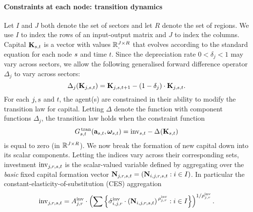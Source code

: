 \documentclass[12pt,a4paper,twoside, draft]{article}
\begin{document}
\paragraph{Constraints at each node: transition dynamics}
Let $I$ and $J$ both denote the set of sectors and let $R$ denote the set of
regions.
We use $I$ to index the rows of an input-output matrix and $J$ to index the
columns.
Capital $\mathbf{K}_{{s}, t}$ is a vector with values
$\nnreal ^ {J \times R}$ that evolves according to the standard equation for
each node ${s}$ and time $t$.
Since the depreciation rate $0 < \delta_{j} < 1$ may vary across sectors, we
allow the following generalised forward difference operator $\Delta_j$ to vary
across sectors:
\[
  \Delta_{j}(\mathbf{K}_{j, {s}, t})
    = \mathbf{K}_{j, {s}, t + 1} -
      (1 - \delta_j) \cdot \mathbf{K}_{j, {s}, t}. 
\]
For each $j, {s} $ and $t$, the agent(s) are constrained in their ability to
modify the transition law for capital.
Letting $\Delta$ denote the function with component functions
$\Delta_{j}$, the transition law holds when the constraint function
\begin{equation}\label{eq-kapital}
  G_{{s}, t}^{\,\textup{tran}}(
    \mathbf{a}_{{s}, t}, \boldsymbol{\omega}_{{s}, t}
  )
    = \textup{inv}_{{s}, t}
      - \Delta_{}(\mathbf{K}_{{s}, t})
\end{equation}
is equal to zero (in $\mathbb R^{J \times R}$).
We now break the formation of new capital down into its scalar components.
Letting the indices vary across their corresponding sets, investment
$\textup{inv}_{j, r, {s}, t}$ is the scalar-valued variable defined by
aggregating over the \emph{basic} fixed capital formation vector
$\mathbf{N}_{j, r, {s}, t} = (\mathbf{N}_{i,j, r, {s}, t}: i \in I)$.
In particular the constant-elasticity-of-substitution (CES) aggregation
\begin{equation}\label{eq-ces-inv}
  \textup{inv}_{j, r, \node, t} = A_{j, r}^{\textup{inv}}
    \cdot \left(\sum%
      \left\{
      \acute \sigma_{i,j, r}^{\textup{inv}}
        \cdot \left( \mathbf{N}_{i,j, r, \node, t}\right)
        ^ {\,\rho_{j, r} ^ {\textup{inv}}}
      : i \in I\right\}
    \right) ^ {1 / \rho_{j, r}^{\textup{inv}}}.
\end{equation}
\end{document}
